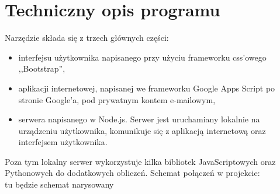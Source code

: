 \chapter{Techniczny opis programu}
Narzędzie składa się z trzech głównych części:
\begin{itemize}
\item interfejsu użytkownika napisanego przy użyciu frameworku css'owego ,,Bootstrap'',
\item aplikacji internetowej, napisanej we frameworku Google Apps Script po stronie Google'a, pod prywatnym kontem e-mailowym, 
\item serwera napisanego w Node.js. Serwer jest uruchamiany lokalnie na urządzeniu użytkownika, komunikuje się z aplikacją internetową oraz interfejsem użytkownika.

\end{itemize}
Poza tym lokalny serwer wykorzystuje kilka bibliotek JavaScriptowych oraz Pythonowych do dodatkowych obliczeń. Schemat połączeń w projekcie:
\\tu będzie schemat narysowany\\%
